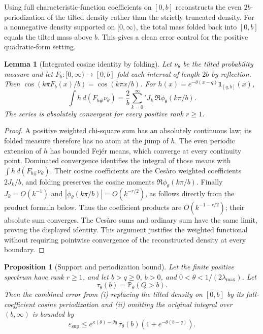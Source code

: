 \documentclass[11pt]{article}
\newtheorem{proposition}[theorem]{Proposition}
\newtheorem{lemma}[theorem]{Lemma}
\theoremstyle{definition}
\theoremstyle{remark}
\newcommand{\Pp}{\mathbb P}
\newcommand{\eps}{\varepsilon}
\begin{document}
Using full characteristic-function coefficients on $[0,b]$ reconstructs the even $2b$-periodization of the tilted density rather than the strictly truncated density. For a nonnegative density supported on $[0,\infty)$, the total mass folded back into $[0,b]$ equals the tilted mass above $b$. This gives a clean error control for the positive quadratic-form setting.


\begin{lemma}[Integrated cosine identity by folding]
\label{lem:folding}
Let \(\nu_\theta\) be the tilted probability measure and let
\(F_b:[0,\infty)\to[0,b]\) fold each interval of length \(2b\) by
reflection.  Then
\(\cos(k\pi F_b(x)/b)=\cos(k\pi x/b)\).
For \(h(x)=e^{-\theta(x-q)}\mathbf1_{[q,b]}(x)\),
\[
\int h\,d(F_{b\#}\nu_\theta)
=\frac2b\sum_{k=0}^{\infty}{}'
J_k\,\Re\phi_\theta(k\pi/b).
\]
The series is absolutely convergent for every positive rank \(r\ge1\).
\end{lemma}
\begin{proof}
A positive weighted chi-square sum has an absolutely continuous law; its
folded measure therefore has no atom at the jump of \(h\).  The even periodic
extension of \(h\) has bounded Fej\'er means, which converge at every continuity
point.  Dominated convergence identifies the integral of those means with
\(\int h\,d(F_{b\#}\nu_\theta)\).  Their cosine coefficients are the Ces\`aro
weighted coefficients \(2J_k/b\), and folding preserves the cosine moments
\(\Re\phi_\theta(k\pi/b)\).  Finally
\(J_k=O(k^{-1})\) and
\(|\phi_\theta(k\pi/b)|=O(k^{-r/2})\), as follows directly from the product
formula below.  Thus the coefficient products are
\(O(k^{-1-r/2})\); their absolute sum converges.  The Ces\`aro sums and ordinary
sum have the same limit, proving the displayed identity.  This argument
justifies the weighted functional without requiring pointwise convergence of
the reconstructed density at every boundary.
\end{proof}

\begin{proposition}[Support and periodization bound]
\label{prop:support}
Let the finite positive spectrum have rank \(r\ge1\), and let
\(b>q\ge0\), \(b>0\), and \(0<\theta<1/(2\lambda_{\max})\).  Let
\[
\tau_{\theta}(b)=\Pp_{\theta}(Q>b).
\]
Then the combined error from (i) replacing the tilted density on $[0,b]$ by its full-coefficient cosine periodization and (ii) omitting the original integral over $(b,\infty)$ is bounded by
\begin{equation}
\eps_{\mathrm{sup}}
\le
e^{\kappa(\theta)-\theta q}\,
\tau_{\theta}(b)
\left(1+e^{-\theta(b-q)}\right).
\label{eq:eps-support}
\end{equation}
\end{proposition}
\end{document}
